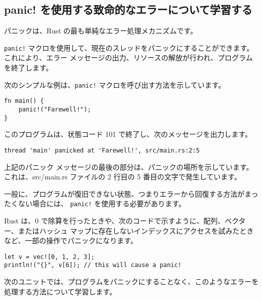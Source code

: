 \subsection{panic! を使用する致命的なエラーについて学習する}

パニックは、Rust の最も単純なエラー処理メカニズムです。

\texttt{panic!} マクロを使用して、現在のスレッドをパニックにすることができます。 これにより、エラー メッセージの出力、リソースの解放が行われ、プログラムを終了します。

次のシンプルな例は、\texttt{panic!} マクロを呼び出す方法を示しています。


\begin{lstlisting}[numbers=none]
fn main() {
    panic!("Farewell!");
}
\end{lstlisting}

このプログラムは、状態コード 101 で終了し、次のメッセージを出力します。

\begin{lstlisting}[numbers=none]
thread 'main' panicked at 'Farewell!', src/main.rs:2:5
\end{lstlisting}

上記のパニック メッセージの最後の部分は、パニックの場所を示しています。 これは、src/main.rs ファイルの 2 行目の 5 番目の文字で発生しています。

一般に、プログラムが復旧できない状態、つまりエラーから回復する方法がまったくない場合には、 \texttt{panic!} を使用する必要があります。

Rust は、0 で除算を行ったときや、次のコードで示すように、配列、ベクター、またはハッシュ マップに存在しないインデックスにアクセスを試みたときなど、一部の操作でパニックになります。


\begin{lstlisting}[numbers=none]
let v = vec![0, 1, 2, 3];
println!("{}", v[6]); // this will cause a panic!
\end{lstlisting}

次のユニットでは、プログラムをパニックにすることなく、このようなエラーを処理する方法について学習します。